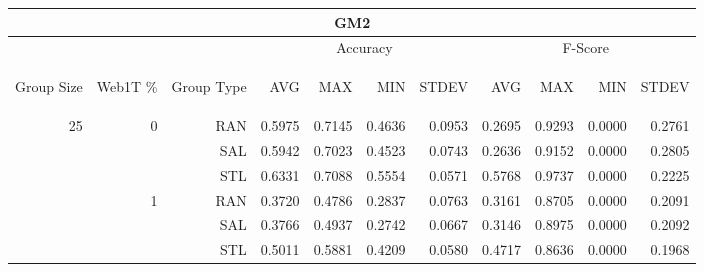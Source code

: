 \begin{center}
\begin{table}[htbp] 
 \begin{center}
\begin{tabular}{ | r | r | r | r | r | r | r | r | r | r | r |}
\hline
\multicolumn{11}{|c|}{GM2}\\
\hline
 & & & \multicolumn{4}{|c|}{Accuracy} & \multicolumn{4}{|c|}{F-Score}\\ \cline{4-11}
\begin{sideways}Group Size\end{sideways} & \begin{sideways}Web1T \%\end{sideways} & \begin{sideways}Group Type\end{sideways} & \begin{sideways}AVG\end{sideways} & \begin{sideways}MAX\end{sideways} & \begin{sideways}MIN\end{sideways} & \begin{sideways}STDEV\end{sideways} & \begin{sideways}AVG\end{sideways} & \begin{sideways}MAX\end{sideways} & \begin{sideways}MIN\end{sideways} & \begin{sideways}STDEV\end{sideways}\\
\hline
\multirow{18}{*}{25}
 & \multirow{3}{*}{0} & RAN & 0.5975 & 0.7145 & 0.4636 & 0.0953 & 0.2695 & 0.9293 & 0.0000 & 0.2761\\ \cline{3-11}
 &   & SAL & 0.5942 & 0.7023 & 0.4523 & 0.0743 & 0.2636 & 0.9152 & 0.0000 & 0.2805\\ \cline{3-11}
 &   & STL & 0.6331 & 0.7088 & 0.5554 & 0.0571 & 0.5768 & 0.9737 & 0.0000 & 0.2225\\ \cline{2-11}
 & \multirow{3}{*}{1} & RAN & 0.3720 & 0.4786 & 0.2837 & 0.0763 & 0.3161 & 0.8705 & 0.0000 & 0.2091\\ \cline{3-11}
 &   & SAL & 0.3766 & 0.4937 & 0.2742 & 0.0667 & 0.3146 & 0.8975 & 0.0000 & 0.2092\\ \cline{3-11}
 &   & STL & 0.5011 & 0.5881 & 0.4209 & 0.0580 & 0.4717 & 0.8636 & 0.0000 & 0.1968\\ \cline{2-11}

\end{tabular}
\end{center}
\end{table}
\end{center}
